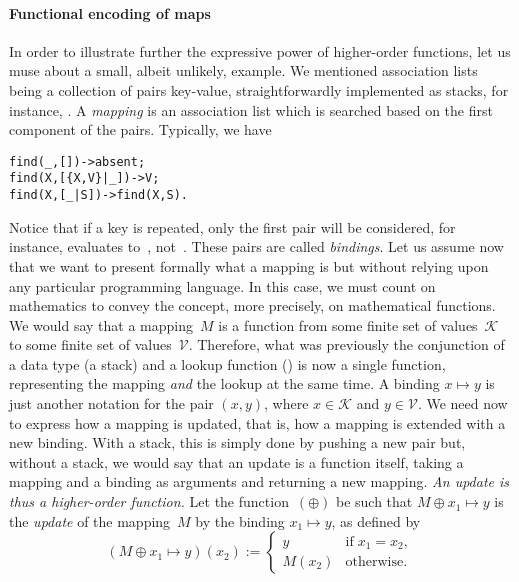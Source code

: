 \paragraph{Functional encoding of maps}

In order to illustrate further the expressive power of
higher\hyp{}order functions, let us muse about a small, albeit
unlikely, example. We mentioned 
association lists being a collection of pairs key\hyp{}value,
straightforwardly implemented as stacks, for instance,
\erlcode{[\{a,0\},\{b,1\},\{a,5\}]}. A \emph{mapping} is an
association list which is searched based on the first component of the
pairs. Typically, we have
\begin{alltt}
find(\_,       []) -> absent;
find(X,[\{X,V\}|\_]) -> V;\hfill% \emph{Associated value found}
find(X,    [\_|S]) -> find(X,S).\hfill% \emph{Keep searching}
\end{alltt}
Notice that if a key is repeated, only the first pair will be
considered, for instance, 
evaluates to~, not~. These pairs are called
\emph{bindings}. Let us assume now that we want to present formally
what a mapping is but without relying upon any particular programming
language. In this case, we must count on mathematics to convey the
concept, more precisely, on mathematical functions. We would say that
a mapping~\(M\) is a function from some finite set of
values~\(\mathcal{K}\) to some finite set of
values~\(\mathcal{V}\). Therefore, what was previously the conjunction
of a data type (a stack) and a lookup function () is
now a single function, representing the mapping \emph{and} the lookup
at the same time. A binding \(x \mapsto y\) is just another notation
for the pair \((x, y)\), where \(x \in \mathcal{K}\) and \(y \in
\mathcal{V}\). We need now to express how a mapping is updated, that
is, how a mapping is extended with a new binding. With a stack, this
is simply done by pushing a new pair but, without a stack, we would
say that an update is a function itself, taking a mapping and a
binding as arguments and returning a new mapping. \emph{An update is
  thus a higher\hyp{}order function.}  Let the function~\((\oplus)\)
be such that \(M \mathrel{\oplus} x_1 \mapsto y\) is the \emph{update}
of the mapping~\(M\) by the binding \(x_1 \mapsto y\), as defined by
\begin{equation*}
(M \mathrel{\oplus} x_1 \mapsto y)(x_2) :=
\begin{cases}
  y      & \text{if} \; x_1 = x_2,\\
  M(x_2) & \text{otherwise.}
\end{cases}
\end{equation*}
